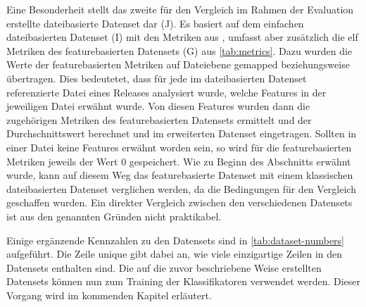 Eine Besonderheit stellt das zweite für den Vergleich im Rahmen der Evaluation erstellte dateibasierte Datenset dar (J). Es basiert auf dem \glqq einfachen\grqq{} dateibasierten Datenset (I) mit den Metriken aus \cite{Moser2008}, umfasst aber zusätzlich die elf Metriken des featurebasierten Datensets (G) aus \autoref{tab:metrics}. Dazu wurden die Werte der featurebasierten Metriken auf Dateiebene \glqq gemapped\grqq{} beziehungsweise übertragen. Dies bedeutetet, dass für jede im dateibasierten Datenset referenzierte Datei eines Releases analysiert wurde, welche Features in der jeweiligen Datei erwähnt wurde. Von diesen Features wurden dann die zugehörigen Metriken des featurebasierten Datensets ermittelt und der Durchschnittswert berechnet und im erweiterten Datenset eingetragen. Sollten in einer Datei keine Features erwähnt worden sein, so wird für die featurebasierten Metriken jeweils der Wert 0 gespeichert. Wie zu Beginn des Abschnitts erwähnt wurde, kann auf diesem Weg das featurebasierte Datenset mit einem klassischen dateibasierten Datenset verglichen werden, da die Bedingungen für den Vergleich geschaffen wurden. Ein direkter Vergleich zwischen den verschiedenen Datensets ist aus den genannten Gründen nicht praktikabel.

Einige ergänzende Kennzahlen zu den Datensets sind in \autoref{tab:dataset-numbers} aufgeführt. Die Zeile \glqq unique\grqq{} gibt dabei an, wie viele einzigartige Zeilen in den Datensets enthalten sind. Die auf die zuvor beschriebene Weise erstellten Datensets können nun zum Training der Klassifikatoren verwendet werden. Dieser Vorgang wird im kommenden Kapitel erläutert.

